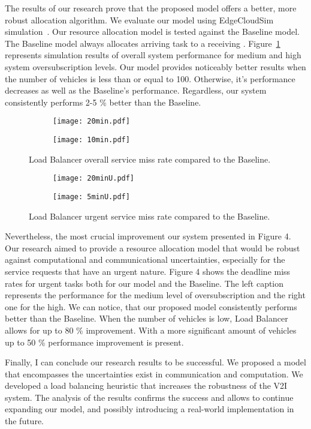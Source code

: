 \documentclass[11pt,a4paper]{article}
\begin{document}
The results of our research prove that the proposed model offers a better, more robust allocation algorithm. We evaluate our model using EdgeCloudSim simulation~\cite{cloudsim}. Our resource allocation model is tested against the Baseline model. The Baseline model always allocates arriving task to a receiving \bs. Figure~\ref{fig:perf} represents simulation results of overall system performance for medium and high system oversubscription levels. Our model provides noticeably better results when the number of vehicles is less than or equal to 100. Otherwise, it's performance decreases as well as the Baseline's performance. Regardless, our system consistently performs 2-5 \% better than the Baseline. 

\begin{figure}[h]
\centering
\begin{subfigure}{.5\textwidth}
  \centering
  \texttt{[image: 20min.pdf]}
\end{subfigure}%
\begin{subfigure}{.5\textwidth}
  \centering
  \texttt{[image: 10min.pdf]}
\end{subfigure}
\caption{Load Balancer overall service miss rate compared to the Baseline.}
\label{fig:perf}
\end{figure}

\begin{figure}[h]
\centering
\begin{subfigure}{.5\textwidth}
  \centering
  \texttt{[image: 20minU.pdf]}
\end{subfigure}%
\begin{subfigure}{.5\textwidth}
  \centering
  \texttt{[image: 5minU.pdf]}
\end{subfigure}
\caption{Load Balancer urgent service miss rate compared to the Baseline.}
\label{fig:perfU}
\end{figure}

Nevertheless, the most crucial improvement our system presented in Figure 4. Our research aimed to provide a resource allocation model that would be robust against computational and communicational uncertainties, especially for the service requests that have an urgent nature. Figure 4 shows the deadline miss rates for urgent tasks both for our model and the Baseline. The left caption represents the performance for the medium level of oversubscription and the right one for the high. We can notice, that our proposed model consistently performs better than the Baseline. When the number of vehicles is low, Load Balancer allows for up to 80 \% improvement. With a more significant amount of vehicles up to 50 \% performance improvement is present.

Finally, I can conclude our research results to be successful. We proposed a model that encompasses the uncertainties exist in communication and computation. We developed a load balancing heuristic that increases the robustness of the V2I system. The analysis of the results confirms the success and allows to continue expanding our model, and possibly introducing a real-world implementation in the future. 



\end{document}
